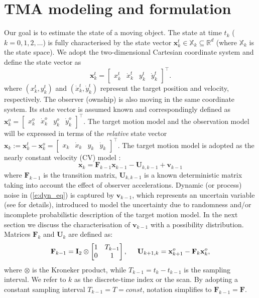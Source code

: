 \documentclass{llncs}
\newcommand{\xb}{\mathbf{x}}
\newcommand{\vb}{\mathbf{v}}
\newcommand{\Fb}{\mathbf{F}}
\newcommand{\Ib}{\mathbf{I}}
\newcommand{\Ub}{\mathbf{U}}
\begin{document}
%
\section{TMA modeling and formulation}
\label{II}
Our goal is to estimate the state of a moving object. The state at time $t_k$ ($k=0,1,2,\dots$) is fully characterised by the state vector $\xb^t_k\in\mathbb{X}_k\subseteq \mathbb{R}^{d}$ (where $\mathbb{X}_k$ is the state space). We adopt the two-dimensional Cartesian coordinate system and define the state vector as
\begin{equation}
\xb^t_k = \left[\begin{matrix}x^t_k & \dot{x}^t_k & y^t_k &
\dot{y}^t_k\end{matrix}\right]^\intercal.
\end{equation}
where $(x^t_k,y^t_k)$ and $(\dot{x}^t_k,\dot{y}^t_k)$ represent the target position and velocity, respectively.
The observer (ownship) is also moving in the same coordinate system. Its state vector is assumed known and correspondingly defined as $\xb^o_k = \left[\begin{matrix}x^o_k & \dot{x}^o_k & y^o_k &
\dot{y}^o_k\end{matrix}\right]^\intercal$.
The target motion model and the observation model will be expressed in terms of the {\em relative} state vector
$\xb_k := \xb^t_k - \xb^o_k =\left[\begin{matrix}x_k & \dot{x}_k & y_k &
\dot{y}_k\end{matrix}\right]^\intercal$.
The target motion model is adopted as the nearly constant velocity (CV) model \cite{barshalom_et_al_01}:
\begin{equation}
\xb_{k} = \Fb_{k-1}\xb_{k-1} -\Ub_{k,k-1}+ \vb_{k-1} \label{e:dyn_eq}
\end{equation}
where $\Fb_{k-1}$ is the transition matrix, $\Ub_{k,k-1}$ is a known
deterministic matrix taking into account the effect of observer
accelerations. Dynamic (or process) noise in (\ref{e:dyn_eq}) is captured by $\vb_{k-1}$, which  represents an uncertain variable (see \cite{houssineau_bishop_17} for details), introduced to model the uncertainty due to randomness and/or incomplete probabilistic description of the target motion model. In the next section we discuss the characterisation of $\vb_{k-1}$ with a possibility distribution.
 Matrices $\Fb_k$ and $\Ub_k$ are defined as:
\begin{equation}
\Fb_{k-1} =  \Ib_2 \otimes \left[\begin{matrix}1 & T_{k-1} \\ 0 &
1\end{matrix}\right], \hspace{5mm}\Ub_{k+1,k}  =  \xb_{k+1}^o-\Fb_k\xb_{k}^o,
\end{equation}
where $\otimes$ is the Kroneker product, while $T_{k-1}=t_{k}-t_{k-1}$ is the
sampling interval. We refer to $k$ as the
discrete-time index or the scan. By adopting a constant sampling interval $T_{k-1}=T=const$, notation
simplifies to $\Fb_{k-1}=\Fb$.
\end{document}
